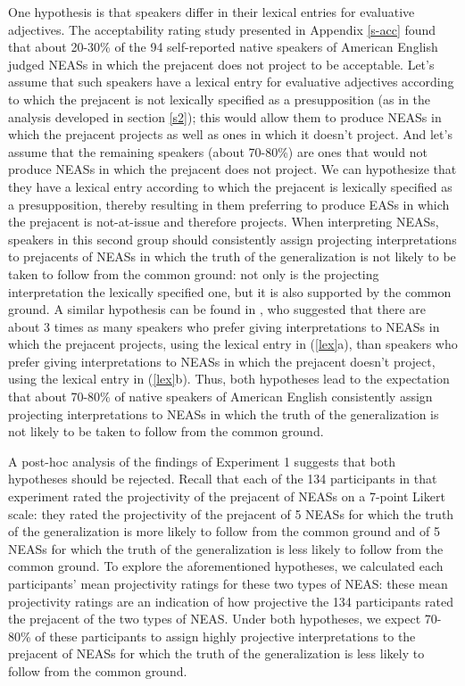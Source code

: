 \documentclass[11pt,fleqn]{article}
\newcommand{\6}{\mbox{$[\hspace*{-.6mm}[$}}
\newcommand{\9}{\mbox{$]\hspace*{-.6mm}]$}}
\begin{document}
One hypothesis is that speakers differ in their lexical entries for evaluative adjectives. The acceptability rating study presented in Appendix \ref{s-acc} found that about 20-30\% of the 94 self-reported native speakers of American English judged NEASs in which the prejacent does not project to be acceptable. Let's assume that such speakers have a lexical entry for evaluative adjectives according to which the prejacent is not lexically specified as a presupposition (as in the analysis developed in section \ref{s2}); this would allow them to produce NEASs in which the prejacent projects as well as ones in which it doesn't project. And let's assume that the remaining speakers (about 70-80\%) are ones that would not produce NEASs in which the prejacent does not project. We can hypothesize that they have a lexical entry according to which the prejacent is lexically specified as a presupposition, thereby resulting in them preferring to produce EASs in which the prejacent is not-at-issue and therefore projects. When interpreting NEASs, speakers in this second group should consistently assign projecting interpretations to prejacents of NEASs in which the truth of the generalization is not likely to be taken to follow from the common ground: not only is the projecting interpretation the lexically specified one, but it is also supported by the common ground. A similar hypothesis can be found in \citet[243]{karttunen-etal2014}, who suggested that there are about 3 times as many speakers who prefer giving interpretations to NEASs in which the prejacent projects, using the lexical entry in (\ref{lex}a), than speakers who prefer giving interpretations to NEASs in which the prejacent doesn't project, using the lexical entry in (\ref{lex}b). Thus, both hypotheses lead to the expectation that about 70-80\% of native speakers of American English consistently assign projecting interpretations to NEASs in which the truth of the generalization is not likely to be taken to follow from the common ground.

A post-hoc analysis of the findings of Experiment  1 suggests that both hypotheses should be rejected. Recall that each of the 134 participants in that experiment rated the projectivity of the prejacent of NEASs on a 7-point Likert scale: they rated the projectivity of the prejacent of 5 NEASs for which the truth of the generalization is more likely to follow from the common ground and of 5 NEASs for which the truth of the generalization is less likely to follow from the common ground. To explore the aforementioned hypotheses, we calculated each participants' mean projectivity ratings for these two types of NEAS: these mean projectivity ratings are an indication of how projective the 134 participants rated the prejacent of the two types of NEAS. Under both hypotheses, we expect 70-80\%  of these participants to assign highly projective interpretations to the prejacent of NEASs for which the truth of the generalization is less likely to follow from the common ground. 
\end{document}

